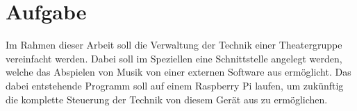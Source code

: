 \section{Aufgabe}
Im Rahmen dieser Arbeit soll die Verwaltung der Technik einer Theatergruppe
vereinfacht werden. Dabei soll im Speziellen eine Schnittstelle angelegt
werden, welche das Abspielen von Musik von einer externen Software aus
ermöglicht. Das dabei entstehende Programm soll auf einem Raspberry Pi laufen,
um zukünftig die komplette Steuerung der Technik von diesem Gerät aus zu
ermöglichen.

